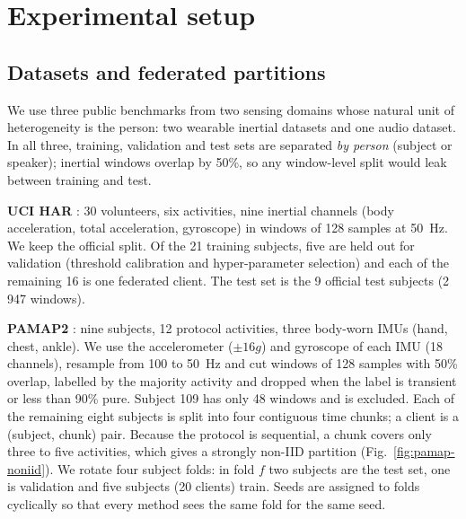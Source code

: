 \section{Experimental setup}\label{sec:setup}

\subsection{Datasets and federated partitions}
We use three public benchmarks from two sensing domains whose natural unit of heterogeneity is the person: two wearable inertial datasets and one audio dataset. In all three, training, validation and test sets are separated \emph{by person} (subject or speaker); inertial windows overlap by 50\%, so any window-level split would leak between training and test.

\textbf{UCI HAR} \citep{anguita2013public}: 30 volunteers, six activities, nine inertial channels (body acceleration, total acceleration, gyroscope) in windows of 128 samples at 50~Hz. We keep the official split. Of the 21 training subjects, five are held out for validation (threshold calibration and hyper-parameter selection) and each of the remaining 16 is one federated client. The test set is the 9 official test subjects (2\,947 windows).

\textbf{PAMAP2} \citep{reiss2012introducing}: nine subjects, 12 protocol activities, three body-worn IMUs (hand, chest, ankle). We use the accelerometer ($\pm16g$) and gyroscope of each IMU (18 channels), resample from 100 to 50~Hz and cut windows of 128 samples with 50\% overlap, labelled by the majority activity and dropped when the label is transient or less than 90\% pure. Subject 109 has only 48 windows and is excluded. Each of the remaining eight subjects is split into four contiguous time chunks; a client is a (subject, chunk) pair. Because the protocol is sequential, a chunk covers only three to five activities, which gives a strongly non-IID partition (Fig.~\ref{fig:pamap-noniid}). We rotate four subject folds: in fold $f$ two subjects are the test set, one is validation and five subjects (20 clients) train. Seeds are assigned to folds cyclically so that every method sees the same fold for the same seed.

